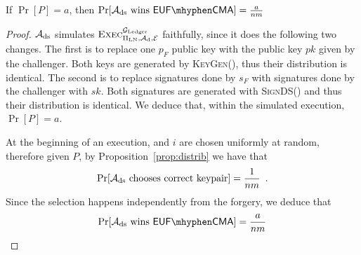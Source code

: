  \begin{proposition}
  \label{prop:forgery:ds}
    If $\Pr[P] = a$, then $\Pr[\adversary_{\mathrm{ds}} \text{ wins }
    \mathsf{EUF \mhyphen CMA}] = \frac{a}{nm}$
  \end{proposition}

  \begin{proof}
    $\mathcal{A}_{\mathrm{ds}}$ simulates
    $\textsc{Exec}^{\mathcal{G}_{\mathrm{Ledger}}}_{\Pi_{\mathrm{LN}}, \mathcal{A}_{\mathrm{d}},
    \mathcal{E}}$ faithfully, since it does the following two changes. The
    first is to replace one $p_F$ public key with the public key $pk$ given by
    the challenger. Both keys are generated by \textsc{KeyGen}(), thus their
    distribution is identical. The second is to replace signatures done by $s_F$
    with signatures done by the challenger with $sk$. Both signatures are
    generated with \textsc{SignDS}() and thus their distribution is identical.
    We deduce that, within the simulated execution, $\Pr[P] = a$.

    At the beginning of an execution, \alice{} and $i$ are chosen uniformly at
    random, therefore given $P$, by Proposition~\ref{prop:distrib} we have that
    \begin{equation*}
      \Pr[\mathcal{A}_{\mathrm{ds}} \text{ chooses correct keypair}] =
      \frac{1}{nm} \enspace.
    \end{equation*}
    Since the selection happens independently from the forgery, we deduce that
    \begin{equation*}
      \Pr[\adversary_{\mathrm{ds}} \text{ wins } \mathsf{EUF \mhyphen CMA}] =
      \frac{a}{nm}
    \end{equation*}
  \end{proof}

